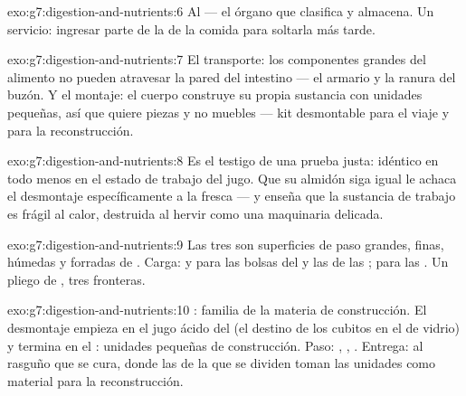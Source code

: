 \begin{solution}{exo:g7:digestion-and-nutrients:6}
Al  --- el órgano que clasifica y almacena. Un servicio: ingresar
parte de la  de la comida para soltarla más tarde.
\end{solution}

\begin{solution}{exo:g7:digestion-and-nutrients:7}
El transporte: los componentes grandes del alimento no pueden atravesar
la pared del intestino --- el armario y la ranura del buzón. Y el
montaje: el cuerpo construye su propia sustancia con unidades pequeñas,
así que quiere piezas y no muebles --- kit desmontable para el viaje y
para la reconstrucción.
\end{solution}

\begin{solution}{exo:g7:digestion-and-nutrients:8}
Es el testigo de una prueba justa: idéntico en todo menos en el estado
de trabajo del jugo. Que su almidón siga igual le achaca el desmontaje
específicamente a la  fresca --- y enseña que la sustancia de
trabajo es frágil al calor, destruida al hervir como una maquinaria
delicada.
\end{solution}

\begin{solution}{exo:g7:digestion-and-nutrients:9}
Las tres son superficies de paso grandes, finas, húmedas y forradas de
. Carga:  y  para las bolsas del 
y las  de las ;  para las . Un
pliego de , tres fronteras.
\end{solution}

\begin{solution}{exo:g7:digestion-and-nutrients:10}
: familia de la materia de construcción. El desmontaje empieza en
el jugo ácido del  (el destino de los cubitos en el  de vidrio) y termina en el : unidades
pequeñas de construcción. Paso: , , . Entrega:
al rasguño que se cura, donde las  de la  que se dividen
toman las unidades como material para la reconstrucción.
\end{solution}

